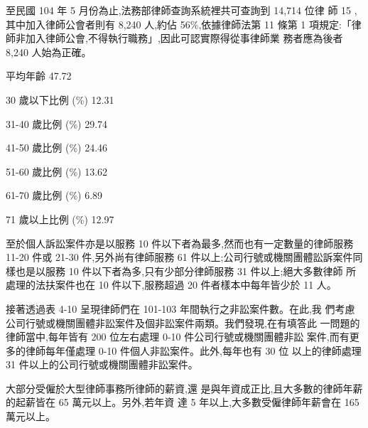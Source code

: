 至民國 104 年 5 月份為止,法務部律師查詢系統裡共可查詢到 14,714 位律
師 15 ,其中加入律師公會者則有 8,240 人,約佔 56\%,依據律師法第 11 條第 1
項規定:「律師非加入律師公會,不得執行職務」,因此可認實際得從事律師業
務者應為後者 8,240 人始為正確。

平均年齡 47.72

30 歲以下比例 (\%) 12.31

31-40 歲比例 (\%) 29.74

41-50 歲比例 (\%) 24.46

51-60 歲比例 (\%) 13.62

61-70 歲比例 (\%) 6.89

71 歲以上比例 (\%) 12.97

至於個人訴訟案件亦是以服務 10 件以下者為最多,然而也有一定數量的律師服務 11-20
件或 21-30 件,另外尚有律師服務 61 件以上;公司行號或機關團體訟訴案件同
樣也是以服務 10 件以下者為多,只有少部分律師服務 31 件以上;絕大多數律師
所處理的法扶案件也在 10 件以下,服務超過 20 件者樣本中每年皆少於 11 人。

接著透過表 4-10 呈現律師們在 101-103 年間執行之非訟案件數。在此,我
們考慮公司行號或機關團體非訟案件及個非訟案件兩類。我們發現,在有填答此
一問題的律師當中,每年皆有 200 位左右處理 0-10 件公司行號或機關團體非訟
案件,而有更多的律師每年僅處理 0-10 件個人非訟案件。此外,每年也有 30 位
以上的律師處理 31 件以上的公司行號或機關團體非訟案件。

大部分受僱於大型律師事務所律師的薪資,還
是與年資成正比,且大多數的律師年薪的起薪皆在 65 萬元以上。另外,若年資
達 5 年以上,大多數受僱律師年薪會在 165 萬元以上。
